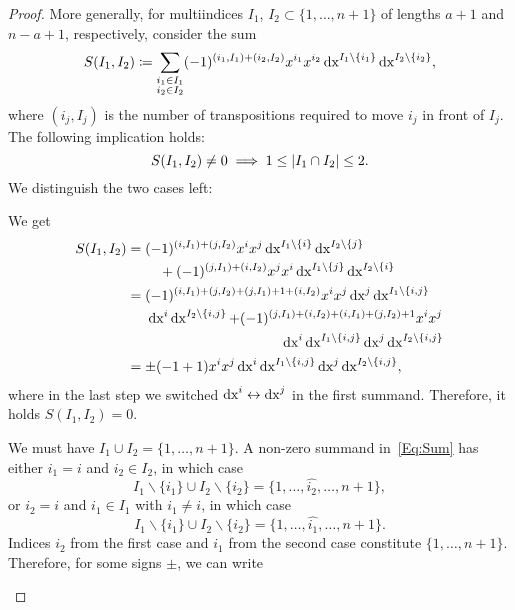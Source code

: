 \documentclass[\MainFolder/Text.tex]{subfiles}
\begin{document}
\begin{proof}
More generally, for multiindices $I_1$, $I_2 \subset \{1,\dotsc, n+1\}$ of lengths $a+1$ and $n-a+1$,  respectively, consider the sum
\begin{equation} \label{Eq:Sum}
S(I_1,I_2) \coloneqq \sum_{\substack{i_1 \in I_1 \\ i_2 \in I_2}} (-1)^{(i_1,I_1) + (i_2,I_2)} x^{i_1} x^{i_2} \operatorname{dx}^{I_1\backslash\{i_1\}} \operatorname{dx}^{I_2\backslash\{i_2\}},
\end{equation}
where $(i_j, I_j)$ is the number of transpositions required to move $i_j$ in front of $I_j$. The following implication holds: 
\begin{equation*}
 S(I_1, I_2)\neq 0\; \Longrightarrow \; 1 \le |I_1 \cap I_2| \le 2.
\end{equation*}
We distinguish the two cases left: 
\begin{description}[font=\normalfont\itshape]
\item[Case $I_1 \cap I_2 =\{i,j\}$ with $i < j$: ] We get
\allowdisplaybreaks
\begin{align*} 
S(I_1, I_2) &= \begin{multlined}[t] (-1)^{(i,I_1) + (j,I_2)} x^{i} x^j \Diff{x}^{I_1 \backslash\{i\}} \Diff{x}^{I_2 \backslash \{j\}} \\ {}+ (-1)^{(j,I_1) + (i,I_2)} x^{j} x^i \Diff{x}^{I_1 \backslash\{j\}} \Diff{x}^{I_2 \backslash \{i\}} \end{multlined} \\
&=\begin{multlined}[t] (-1)^{(i,I_1) + (j,I_2) + (j,I_1)+1 + (i,I_2)} x^i x^j \Diff{x}^j \Diff{x}^{I_1\backslash\{i,j\}}\\\Diff{x}^i \Diff{x}^{I_2\backslash\{i,j\}} + (-1)^{(j,I_1) + (i,I_2)+(i,I_1)+ (j,I_2)+1} x^i x^j \\ \Diff{x}^i \Diff{x}^{I_1\backslash\{i,j\}}\Diff{x}^j \Diff{x}^{I_2\backslash\{i,j\}} \end{multlined} \\
&= \pm(-1 +  1) x^i x^j \Diff{x}^i \Diff{x}^{I_1\backslash\{i,j\}} \Diff{x}^j\Diff{x}^{I_2\backslash\{i,j\}},
\end{align*}
where in the last step we switched $\operatorname{dx}^i \leftrightarrow \operatorname{dx}^j$ in the first summand. Therefore, it holds $S(I_1, I_2) = 0$.
\item[Case $I_1 \cap I_2 = \{i\}$:] We must have $I_1 \cup I_2 = \{1,\dotsc,n+1\}$. A non-zero summand in~\eqref{Eq:Sum} has either $i_1 = i$ and $i_2\in I_2$, in which case $$I_1\backslash \{i_1\} \cup I_2\backslash\{i_2\}= \{1, \dotsc, \widehat{i_2}, \dotsc, n+1\}, $$ or $i_2 = i$ and $i_1\in I_1$ with $i_1 \neq i$, in which case $$I_1\backslash \{i_1\} \cup I_2\backslash\{i_2\}= \{1, \dotsc, \widehat{i_1}, \dotsc, n+1\}.$$ Indices $i_2$ from the first case and $i_1$ from the second case constitute $\{1,\dotsc,n+1\}$. Therefore, for some signs $\pm$, we can write

\end{description}
\end{proof}
\end{document}
